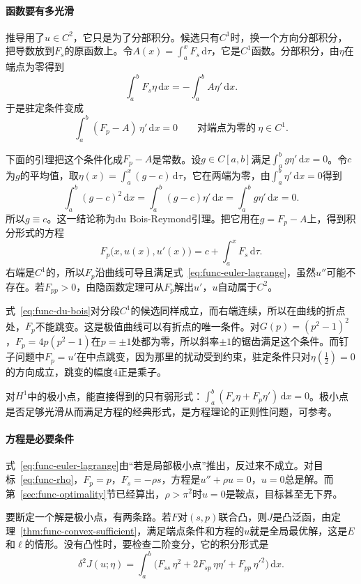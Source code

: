 \paragraph{函数要有多光滑}
推导用了$u\in C^2$，它只是为了分部积分。候选只有$C^1$时，换一个方向分部积分，把导数放到$F_s$的原函数上。令$A(x)=\int_a^xF_s\,\mathrm{d}\tau$，它是$C^1$函数。分部积分，由$\eta$在端点为零得到
\[
 \int_a^bF_s\eta\,\mathrm{d}x=-\int_a^bA\eta'\,\mathrm{d}x.
\]
于是驻定条件变成
\[
 \int_a^b(F_p-A)\,\eta'\,\mathrm{d}x=0\qquad\text{对端点为零的}\ \eta\in C^1.
\]

下面的引理把这个条件化成$F_p-A$是常数。设$g\in C[a,b]$满足$\int_a^bg\eta'\,\mathrm{d}x=0$。令$c$为$g$的平均值，取$\eta(x)=\int_a^x(g-c)\,\mathrm{d}\tau$，它在两端为零，由$\int_a^b\eta'\,\mathrm{d}x=0$得到
\[
 \int_a^b(g-c)^2\,\mathrm{d}x=\int_a^b(g-c)\eta'\,\mathrm{d}x=\int_a^bg\eta'\,\mathrm{d}x=0.
\]
所以$g\equiv c$。这一结论称为du Bois-Reymond引理。把它用在$g=F_p-A$上，得到积分形式的方程
\begin{equation}
 F_p\bigl(x,u(x),u'(x)\bigr)=c+\int_a^xF_s\,\mathrm{d}\tau.
 \label{eq:func-du-bois}
\end{equation}
右端是$C^1$的，所以$F_p$沿曲线可导且满足式~\eqref{eq:func-euler-lagrange}，虽然$u''$可能不存在。若$F_{pp}>0$，由隐函数定理可从$F_p$解出$u'$，$u$自动属于$C^2$。

式~\eqref{eq:func-du-bois}对分段$C^1$的候选同样成立，而右端连续，所以在曲线的折点处，$F_p$不能跳变。这是极值曲线可以有折点的唯一条件。对$G(p)=(p^2-1)^2$，$F_p=4p(p^2-1)$在$p=\pm1$处都为零，所以斜率$\pm1$的锯齿满足这个条件。而钉子问题中$F_p=u'$在中点跳变，因为那里的扰动受到约束，驻定条件只对$\eta(\frac12)=0$的方向成立，跳变的幅度$4$正是乘子。

对$H^1$中的极小点，能直接得到的只有弱形式：$\int_a^b(F_s\eta+F_p\eta')\,\mathrm{d}x=0$。极小点是否足够光滑从而满足方程的经典形式，是方程理论的正则性问题，可参考。

\paragraph{方程是必要条件}
式~\eqref{eq:func-euler-lagrange}由“若是局部极小点”推出，反过来不成立。对目标~\eqref{eq:func-rho}，$F_p=p$，$F_s=-\rho s$，方程是$u''+\rho u=0$，$u=0$总是解。而第~\ref{sec:func-optimality}节已经算出，$\rho>\pi^2$时$u=0$是鞍点，目标甚至无下界。

要断定一个解是极小点，有两条路。若$F$对$(s,p)$联合凸，则$J$是凸泛函，由定理~\ref{thm:func-convex-sufficient}，满足端点条件和方程的$u$就是全局最优解，这是$E$和$\ell$的情形。没有凸性时，要检查二阶变分，它的积分形式是
\begin{equation}
 \delta^2J(u;\eta)=\int_a^b\bigl(F_{ss}\,\eta^2+2F_{sp}\,\eta\eta'+F_{pp}\,\eta'^2\bigr)\,\mathrm{d}x.
 \label{eq:func-second-variation-integral}
\end{equation}

